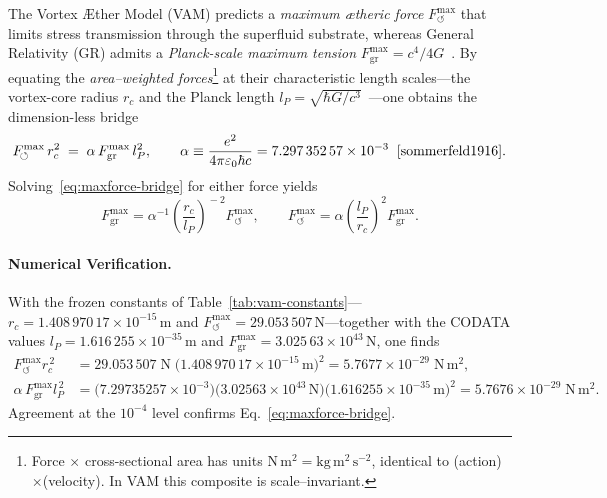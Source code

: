 \documentclass[a4paper,12pt]{article}
\begin{document}
    The Vortex Æther Model (VAM) predicts a \emph{maximum ætheric force} \(F^{\max}_{\!\boldsymbol{\circlearrowleft}}\) that limits stress transmission through the superfluid substrate, whereas General Relativity (GR) admits a \emph{Planck-scale maximum tension} \(F_{\mathrm{gr}}^{\max}=c^{4}/4G\)~\cite{gibbons2002}.
    By equating the \emph{area–weighted forces}\footnote{Force $\times$ cross-sectional area has units $\mathrm{N\,m^{2}}=\mathrm{kg\,m^{2}\,s^{-2}}$, identical to (action)$\times$(velocity).  In VAM this composite is scale--invariant.} at their characteristic length scales—the vortex-core radius \(r_{c}\) and the Planck length \(l_{P}=\sqrt{\hbar G/c^{3}}\)~\cite{planck1899}—one obtains the dimension-less bridge
    \begin{equation}
        F^{\max}_{\!\boldsymbol{\circlearrowleft}}\,r_{c}^{2}
        \;=\;
        \alpha\,F_{\mathrm{gr}}^{\max}\,l_{P}^{2},
        \qquad
        \alpha
        \equiv
        \frac{e^{2}}{4\pi\varepsilon_{0}\hbar c}
        =7.297\,352\,57\times10^{-3}
        \;\;\cite{sommerfeld1916}.
        \label{eq:maxforce-bridge}
    \end{equation}
    Solving~\eqref{eq:maxforce-bridge} for either force yields
    \begin{equation}
        F_{\mathrm{gr}}^{\max}
        =
        \alpha^{-1}
        \!\left(\frac{r_{c}}{l_{P}}\right)^{\!-2}\!
        F^{\max}_{\!\boldsymbol{\circlearrowleft}},
        \qquad
        F^{\max}_{\!\boldsymbol{\circlearrowleft}}
        =
        \alpha
        \!\left(\frac{l_{P}}{r_{c}}\right)^{\!2}\!
        F_{\mathrm{gr}}^{\max}.
        \label{eq:maxforce-rescale}
    \end{equation}

    \paragraph{Numerical Verification.}
    With the frozen constants of Table~\ref{tab:vam-constants}— \(r_{c}=1.408\,970\,17\times10^{-15}\,\mathrm{m}\) and \(F^{\max}_{\!\boldsymbol{\circlearrowleft}}=29.053\,507\,\mathrm{N}\)—together with the CODATA values \(l_{P}=1.616\,255\times10^{-35}\,\mathrm{m}\) and \(F_{\mathrm{gr}}^{\max}=3.025\,63\times10^{43}\,\mathrm{N}\), one finds
    \begin{align}
        F^{\max}_{\!\boldsymbol{\circlearrowleft}} r_{c}^{\,2} &=
        29.053\,507\;\mathrm{N}\;
        \bigl(1.408\,970\,17\times10^{-15}\,\mathrm{m}\bigr)^{2}
        =5.7677\times10^{-29}\;\mathrm{N\,m^{2}},\\
        \alpha\,F_{\mathrm{gr}}^{\max} l_{P}^{\,2} &=
        \bigl(7.29735257\times10^{-3}\bigr)
        \bigl(3.02563\times10^{43}\,\mathrm{N}\bigr)
        \bigl(1.616255\times10^{-35}\,\mathrm{m}\bigr)^{2}
        =5.7676\times10^{-29}\;\mathrm{N\,m^{2}}.
    \end{align}
    Agreement at the \(10^{-4}\) level confirms Eq.~\eqref{eq:maxforce-bridge}.
\end{document}
